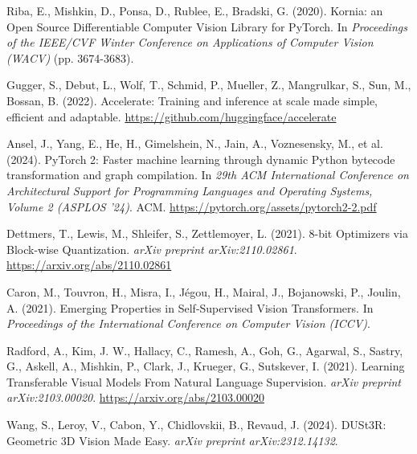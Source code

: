 \documentclass{article}
\begin{document}
{\begin{thebibliography}{99}
    Riba, E., Mishkin, D., Ponsa, D., Rublee, E., Bradski, G. (2020).
    Kornia: an Open Source Differentiable Computer Vision Library for PyTorch.
    In \textit{Proceedings of the IEEE/CVF Winter Conference on Applications of Computer Vision (WACV)} (pp. 3674-3683).

    Gugger, S., Debut, L., Wolf, T., Schmid, P., Mueller, Z., Mangrulkar, S., Sun, M., Bossan, B. (2022).
    Accelerate: Training and inference at scale made simple, efficient and adaptable.
    \url{https://github.com/huggingface/accelerate}

    Ansel, J., Yang, E., He, H., Gimelshein, N., Jain, A., Voznesensky, M., et al. (2024).
    PyTorch 2: Faster machine learning through dynamic Python bytecode transformation and graph compilation.
    In \textit{29th ACM International Conference on Architectural Support for Programming Languages and Operating Systems, Volume 2 (ASPLOS '24)}. ACM.
    \url{https://pytorch.org/assets/pytorch2-2.pdf}

    Dettmers, T., Lewis, M., Shleifer, S., Zettlemoyer, L. (2021).
    8-bit Optimizers via Block-wise Quantization.
    \textit{arXiv preprint arXiv:2110.02861}.
    \url{https://arxiv.org/abs/2110.02861}

    Caron, M., Touvron, H., Misra, I., J\'egou, H., Mairal, J., Bojanowski, P., Joulin, A. (2021).
    Emerging Properties in Self-Supervised Vision Transformers.
    In \textit{Proceedings of the International Conference on Computer Vision (ICCV)}.

    Radford, A., Kim, J. W., Hallacy, C., Ramesh, A., Goh, G., Agarwal, S., Sastry, G., Askell, A., Mishkin, P., Clark, J., Krueger, G., Sutskever, I. (2021).
    Learning Transferable Visual Models From Natural Language Supervision.
    \textit{arXiv preprint arXiv:2103.00020}.
    \url{https://arxiv.org/abs/2103.00020}

    Wang, S., Leroy, V., Cabon, Y., Chidlovskii, B., Revaud, J. (2024). %
    DUSt3R: Geometric 3D Vision Made Easy.
    \textit{arXiv preprint arXiv:2312.14132}.

\end{thebibliography}
} %

\appendix %
\end{document}
